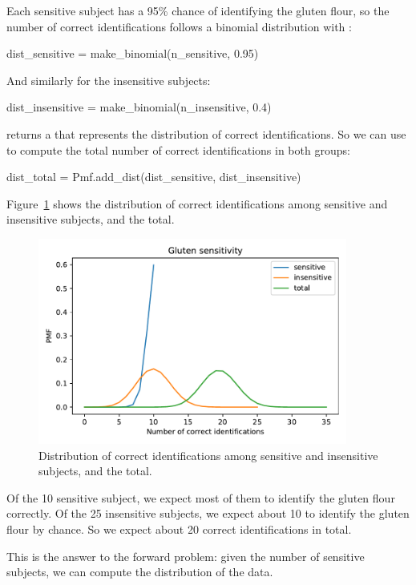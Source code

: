 \documentclass[12pt]{book}
\theoremstyle{exercise}
\begin{document}
Each sensitive subject has a 95\% chance of identifying the gluten flour, so the number of correct identifications follows a binomial distribution with :

\begin{code}
dist_sensitive = make_binomial(n_sensitive, 0.95)
\end{code}

And similarly for the insensitive subjects:

\begin{code}
dist_insensitive = make_binomial(n_insensitive, 0.4)
\end{code}

 returns a  that represents the distribution of correct identifications.
So we can use  to compute the total number of correct identifications in both groups:

\begin{code}
dist_total = Pmf.add_dist(dist_sensitive, dist_insensitive)
\end{code}

Figure~\ref{fig05-02} shows the distribution of correct identifications among sensitive and insensitive subjects, and the total.

\begin{figure}
\centerline{\includegraphics[width=4in]{figs/fig05-02.pdf}}
\caption{Distribution of correct identifications among sensitive and insensitive subjects, and the total.}
\label{fig05-02}
\end{figure}

Of the 10 sensitive subject, we expect most of them to identify the gluten flour correctly.
Of the 25 insensitive subjects, we expect about 10 to identify the gluten flour by chance.
So we expect about 20 correct identifications in total.

This is the answer to the forward problem: given the number of sensitive subjects, we can compute the distribution of the data.
\end{document}
